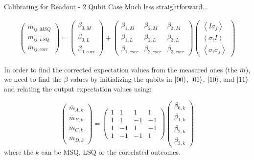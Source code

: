 \begin{frame}{Calibrating for Readout - 2 Qubit Case}
  Much less straightforward...
  
  \begin{equation*}
    \label{beta}
    \begin{split}
      \begin{pmatrix}
        \overline{m}_{ij,MSQ} \\ \overline{m}_{ij,LSQ} \\ \overline{m}_{ij,corr}
      \end{pmatrix} =
      \begin{pmatrix}
        \beta_{0,M} \\ \beta_{0,L} \\ \beta_{0,corr}
      \end{pmatrix} + 
      \begin{pmatrix}
        \beta_{1,M}&\beta_{2,M}&\beta_{3,M} \\
        \beta_{1,L}&\beta_{2,L}&\beta_{3,L} \\
        \beta_{1,corr}&\beta_{2,corr}&\beta_{3,corr}
      \end{pmatrix}
      \begin{pmatrix}
        \left\langle I\sigma_j\right\rangle \\ \left\langle
          \sigma_iI\right\rangle \\ \left\langle \sigma_i\sigma_j\right\rangle
      \end{pmatrix}
    \end{split}
  \end{equation*}

In order to find the corrected expectation values from the measured ones (the
$\bar{m}$), we need to find the $\beta$ values by initializing the qubits in
$\ket{00}$, $\ket{01}$, $\ket{10}$, and $\ket{11}$ and relating the output
expectation values using:
  
\begin{equation}
  \begin{pmatrix}
    \overline{m}_{A,k} \\ \overline{m}_{B,k} \\ \overline{m}_{C,k}
    \\ \overline{m}_{D,k}
  \end{pmatrix} =
  \begin{pmatrix}
    1&1&1&1\\
    1&1&-1&-1\\
    1&-1&1&-1\\
    1&-1&-1&1
  \end{pmatrix}
  \begin{pmatrix}
    \beta_{0,k} \\ \beta_{1,k} \\ \beta_{2,k} \\ \beta_{3,k}
  \end{pmatrix}
\end{equation}
where the $k$ can be MSQ, LSQ or the correlated outcomes.

\end{frame}
  
